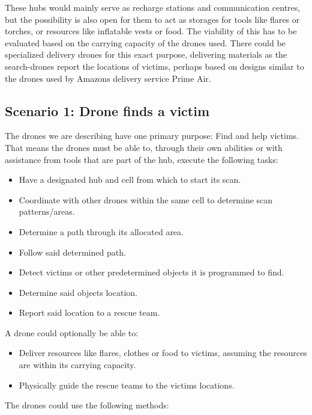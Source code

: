 \documentclass[fleqn,10pt]{wlscirep}
\newcommand{\citesup}[1]{\textsuperscript{\cite{#1}}}
\begin{document}
These hubs would mainly serve as recharge stations and communication centres, but the possibility is also open for them to act as storages for tools like flares or torches, or resources like inflatable vests or food. The viability of this has to be evaluated based on the carrying capacity of the drones used. There could be specialized delivery drones for this exact purpose, delivering materials as the search-drones report the locations of victims, perhaps based on designs similar to the drones used by Amazons delivery service Prime Air\citesup{Prime_Air}.

\subsection{Scenario 1: Drone finds a victim}
The drones we are describing have one primary purpose: Find and help victims. That means the drones must be able to, through their own abilities or with assistance from tools that are part of the hub, execute the following tasks:

\begin{itemize}
  \item Have a designated hub and cell from which to start its scan.
  \item Coordinate with other drones within the same cell to determine scan patterns/areas.
  \item Determine a path through its allocated area.
  \item Follow said determined path.
  \item Detect victims or other predetermined objects it is programmed to find.
  \item Determine said objects location.
  \item Report said location to a rescue team.
\end{itemize}

A drone could optionally be able to:

\begin{itemize}
  \item Deliver resources like flares, clothes or food to victims, assuming the resources are within its carrying capacity.
  \item Physically guide the rescue teams to the victims locations.
\end{itemize}

The drones could use the following methods:
\end{document}
